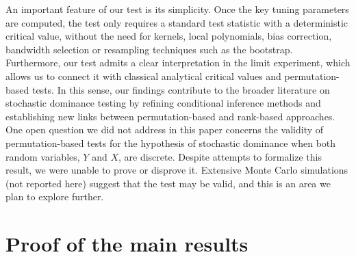 \documentclass[11pt]{article}
\renewcommand{\theequation}{\thesection.\arabic{equation}}
\numberwithin{equation}{section}
\begin{document}
An important feature of our test is its simplicity. Once the key tuning parameters are computed, the test only requires a standard test statistic with a deterministic critical value, without the need for kernels, local polynomials, bias correction, bandwidth selection or resampling techniques such as the bootstrap. Furthermore, our test admits a clear interpretation in the limit experiment, which allows us to connect it with classical analytical critical values and permutation-based tests. In this sense, our findings contribute to the broader literature on stochastic dominance testing by refining conditional inference methods and establishing new links between permutation-based and rank-based approaches. One open question we did not address in this paper concerns the validity of permutation-based tests for the hypothesis of stochastic dominance when both random variables, $Y$ and $X$, are discrete. Despite attempts to formalize this result, we were unable to prove or disprove it. Extensive Monte Carlo simulations (not reported here) suggest that the test may be valid, and this is an area we plan to explore further. 


\appendices
\renewcommand{\theequation}{\Alph{section}-\arabic{equation}}
\setcounter{equation}{0}
\small 

\section{Proof of the main results}\label{app:main-proofs}

\end{document}
